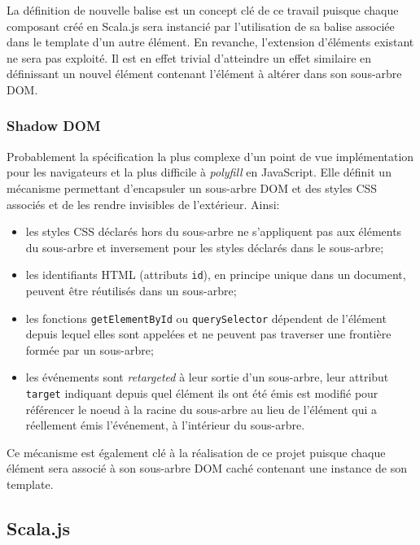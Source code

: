 La définition de nouvelle balise est un concept clé de ce travail puisque chaque composant créé en Scala.js sera instancié par l'utilisation de sa balise associée dans le template d'un autre élément. En revanche, l'extension d'éléments existant ne sera pas exploité. Il est en effet trivial d'atteindre un effet similaire en définissant un nouvel élément contenant l'élément à altérer dans son sous-arbre DOM.

\subsubsection{Shadow DOM}

Probablement la spécification la plus complexe d'un point de vue implémentation pour les navigateurs et la plus difficile à \emph{polyfill} en JavaScript. Elle définit un mécanisme permettant d'encapsuler un sous-arbre DOM et des styles CSS associés et de les rendre invisibles de l'extérieur. Ainsi:

\begin{itemize}
	\item les styles CSS déclarés hors du sous-arbre ne s'appliquent pas aux éléments du sous-arbre et inversement pour les styles déclarés dans le sous-arbre;
	
	\item les identifiants HTML (attributs \texttt{id}), en principe unique dans un document, peuvent être réutilisés dans un sous-arbre;
	
	\item les fonctions \texttt{getElementById} ou \texttt{querySelector} dépendent de l'élément depuis lequel elles sont appelées et ne peuvent pas traverser une frontière formée par un sous-arbre;
	
	\item les événements sont \emph{retargeted} à leur sortie d'un sous-arbre, leur attribut \texttt{target} indiquant depuis quel élément ils ont été émis est modifié pour référencer le noeud à la racine du sous-arbre au lieu de l'élément qui a réellement émis l'événement, à l'intérieur du sous-arbre.
\end{itemize}

Ce mécanisme est également clé à la réalisation de ce projet puisque chaque élément sera associé à son sous-arbre DOM caché contenant une instance de son template.

\subsection{Scala.js}

